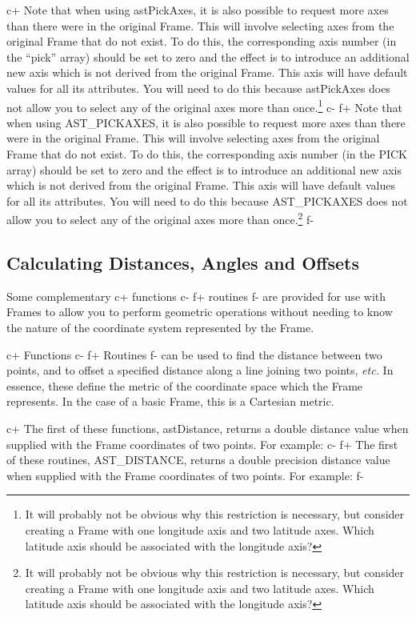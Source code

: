 \documentclass[twoside,11pt]{starlink}
\begin{document}
c+
Note that when using astPickAxes, it is also possible to request more
axes than there were in the original Frame. This will involve
selecting axes from the original Frame that do not exist. To do this,
the corresponding axis number (in the ``pick'' array) should be set to
zero and the effect is to introduce an additional new axis which is
not derived from the original Frame. This axis will have default
values for all its attributes. You will need to do this because
astPickAxes does not allow you to select any of the original axes more
than once.\footnote{It will probably not be obvious why this
restriction is necessary, but consider creating a Frame with one
longitude axis and two latitude axes. Which latitude axis should be
associated with the longitude axis?}
c-
f+
Note that when using AST\_PICKAXES, it is also possible to request
more axes than there were in the original Frame. This will involve
selecting axes from the original Frame that do not exist. To do this,
the corresponding axis number (in the PICK array) should be set to
zero and the effect is to introduce an additional new axis which is
not derived from the original Frame. This axis will have default
values for all its attributes. You will need to do this because
AST\_PICKAXES does not allow you to select any of the original axes
more than once.\footnote{It will probably not be obvious why this
restriction is necessary, but consider creating a Frame with one
longitude axis and two latitude axes. Which latitude axis should be
associated with the longitude axis?}
f-

\subsection{\label{ss:distanceandoffset}Calculating Distances, Angles and Offsets}
Some complementary
c+
functions
c-
f+
routines
f-
are provided for use with Frames to allow you to perform geometric
operations without needing to know the nature of the coordinate system
represented by the Frame.

c+
Functions
c-
f+
Routines
f-
can be used to find the distance between two points, and to offset a
specified distance along a line joining two points, \emph{etc.} In essence,
these define the metric of the coordinate space which the Frame represents. In
the case of a basic Frame, this is a Cartesian metric.

c+
The first of these functions, astDistance, returns a double distance
value when supplied with the Frame coordinates of two points. For
example:
c-
f+
The first of these routines, AST\_DISTANCE, returns a double precision
distance value when supplied with the Frame coordinates of two
points. For example:
f-
\end{document}
